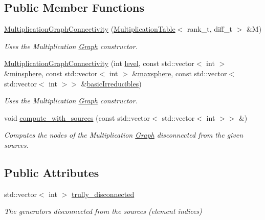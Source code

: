 \subsection*{Public Member Functions}
\begin{DoxyCompactItemize}
\item 
\hyperlink{classMackey_1_1MultiplicationGraphConnectivity_aef4ccbe9bb70020fc9ed264964fbda7d}{Multiplication\+Graph\+Connectivity} (\hyperlink{classMackey_1_1MultiplicationTable}{Multiplication\+Table}$<$ rank\+\_\+t, diff\+\_\+t $>$ \&M)
\begin{DoxyCompactList}\small\item\em Uses the Multiplication \hyperlink{classMackey_1_1Graph}{Graph} constructor. \end{DoxyCompactList}\item 
\hyperlink{classMackey_1_1MultiplicationGraphConnectivity_a7e902dcb12c7731f335b38d65a5d9ab3}{Multiplication\+Graph\+Connectivity} (int \hyperlink{classMackey_1_1MultiplicationTable_ad5a05c126e0b3c769fa9b1196a8db96a}{level}, const std\+::vector$<$ int $>$ \&\hyperlink{classMackey_1_1MultiplicationTable_a071f7d7c6cd1c75836b64ea8e9923b49}{minsphere}, const std\+::vector$<$ int $>$ \&\hyperlink{classMackey_1_1MultiplicationTable_a4355003c6be4a4f857eba151c8e5bcf6}{maxsphere}, const std\+::vector$<$ std\+::vector$<$ int $>$$>$ \&\hyperlink{classMackey_1_1MultiplicationTable_af6896ea01c087e71533de423d7cf65ac}{basic\+Irreducibles})
\begin{DoxyCompactList}\small\item\em Uses the Multiplication \hyperlink{classMackey_1_1Graph}{Graph} constructor. \end{DoxyCompactList}\item 
void \hyperlink{classMackey_1_1MultiplicationGraphConnectivity_a81e8f3efb867ea951573a2a5ca5825ed}{compute\+\_\+with\+\_\+sources} (const std\+::vector$<$ std\+::vector$<$ int $>$$>$ \&)
\begin{DoxyCompactList}\small\item\em Computes the nodes of the Multiplication \hyperlink{classMackey_1_1Graph}{Graph} disconnected from the given sources. \end{DoxyCompactList}\end{DoxyCompactItemize}
\subsection*{Public Attributes}
\begin{DoxyCompactItemize}
\item 
std\+::vector$<$ int $>$ \hyperlink{classMackey_1_1MultiplicationGraphConnectivity_a4f13de641c34260697b086a9e0a559e9}{trully\+\_\+disconnected}
\begin{DoxyCompactList}\small\item\em The generators disconnected from the sources (element indices) \end{DoxyCompactList}\end{DoxyCompactItemize}
